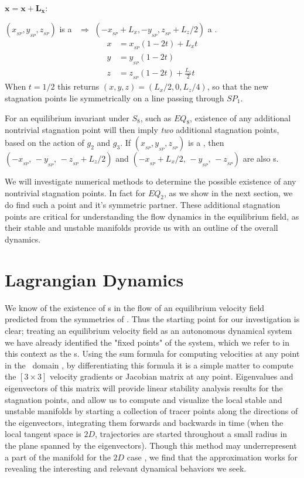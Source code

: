 \documentclass[letter,12pt,openany]{article}
\begin{document}
 \noindent$\mathbf{x = x + L_{x}}$:

 \noindent $(x_{_{SP}},y_{_{SP}},z_{_{SP}})$ is a \stagp\ $\Rightarrow$
 $(-x_{_{SP}}+L_{x},-y_{_{SP}},z_{_{SP}}+L_{z}/2)$ a \stagp.
 \begin{align}
  x &= x_{_{SP}}(1-2t) + L_{x}t \\
  y &= y_{_{SP}}(1-2t) \\
  z &= z_{_{SP}}(1-2t) + \frac{L_{z}}{2} t
 \end{align}
 When $t = 1/2$ this returns $(x,y,z) = (L_{x}/2,0,L_{z}/4)$, so that the new stagnation
 points lie symmetrically on a line passing through $SP_1$. 

 For an equilibrium invariant under $S_8$, such as $EQ_8$, existence of any additional nontrivial stagnation point will then imply \textit{two} additional stagnation points, based on the action of $g_2$ and $g_3$.
 If $(x_{_{SP}},y_{_{SP}},z_{_{SP}})$ is a \stagp, then  $(-x_{_{SP}},\, -y_{_{SP}},\, -z_{_{SP}}+L_z/2)$ and $(-x_{_{SP}} + L_x/2,\, -y_{_{SP}},\, -z_{_{SP}})$ are also \stagp s. 

 We will investigate numerical methods to determine the possible existence of any nontrivial stagnation points. In fact for $EQ_2$, as we show in the next section, we do find such a point and it's symmetric partner. These additional stagnation points are critical for understanding the flow dynamics in the equilibrium field, as their stable and unstable manifolds provide us with an outline of the overall dynamics.
 

 
 



\section{\centering Lagrangian Dynamics}
\label{sec:Lagrangian}


We know of the existence of  \stagp s in the flow of an equilibrium velocity field
predicted from the symmetries of \pCf. Thus the starting point for our investigation is clear; treating an equilibrium velocity field as an autonomous dynamical system we have already identified the "fixed points" of the system, which we refer to in this context as the \stagp s.  Using the sum formula for computing velocities at
any point in the \pCf\ domain , by differentiating this formula it is a simple
matter to compute the $[3\!\times\! 3]$ velocity gradients or Jacobian matrix
at any point. Eigenvalues and eigenvectors of this matrix will
provide linear stability analysis results for the stagnation points, and allow us to compute and visualize the local stable
and unstable manifolds by starting a collection of tracer points along the directions of the eigenvectors, integrating them forwards and backwards in time (when the local tangent space is $2D$, trajectories are started throughout a small radius in the plane spanned by the eigenvectors). Though this method may underrepresent a part of the manifold for the $2D$ case \cite{SahVla09}, we find that the approximation works for revealing the interesting and relevant dynamical behaviors we seek.
\end{document}
